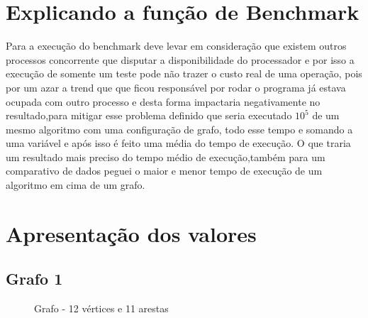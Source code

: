 \documentclass[12pt]{article}
\begin{document}
     \section{Explicando a função de Benchmark} \label{sec:benckmark}

     Para a execução do benchmark deve levar em consideração que existem outros processos 
     concorrente que disputar a disponibilidade do processador e por isso a execução de somente um teste pode
      não trazer o custo real de uma operação, pois por um azar a trend que que ficou responsável por rodar o 
      programa já estava ocupada com outro processo e desta forma impactaria negativamente no resultado,para
       mitigar esse problema definido que seria executado $10^5$ de um mesmo algoritmo  com uma configuração de 
       grafo, todo esse tempo e somando a uma variável e após isso é feito uma média do tempo de execução. 
       O que traria um resultado mais preciso do tempo médio de execução,também para um comparativo de dados 
       peguei o maior e menor tempo de execução de um algoritmo em cima de um grafo. 
        
       \section{Apresentação dos valores} \label{sec:resultados}
   
 
       \subsection{Grafo 1}

       \begin{figure}[ht]
         \centering
         \caption{Grafo  - 12 vértices e 11 arestas }
     
       \end{figure}
 
\end{document}
